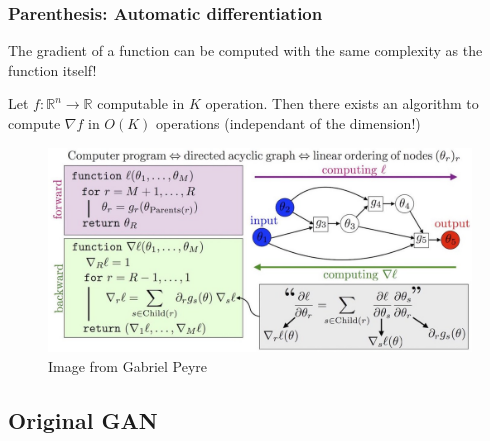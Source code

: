 \documentclass[french,9pt]{beamer}
\begin{document}
\begin{frame}
\frametitle{Parenthesis: Automatic differentiation}
The gradient of a function can be computed with the same complexity as the function itself! \cite{Griewank2012WhoIT,Linnainmaa1976}

\begin{theorem}
Let $f: \mathbb{R}^{n} \rightarrow \mathbb{R}$ computable in $K$ operation. Then there exists an algorithm to compute $\nabla f$ in $O(K)$ operations (independant of the dimension!)
\end{theorem}

\begin{figure}
  \begin{center}
    \includegraphics[width=1\textwidth]{fig/forward_backward.jpeg}
  \end{center}
  \caption{\tiny{Image from Gabriel Peyre}}
\end{figure}

\end{frame}



\subsection{Original GAN \cite{googfellow2014}}
\end{document}

